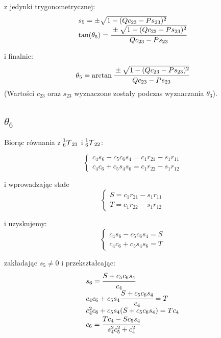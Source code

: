 \documentclass[]{article}
\newcommand\T{\mathcal{T}}
\begin{document}
z jedynki trygonometrycznej:
\begin{equation}\begin{array}{l}
s_5 = \pm \sqrt{1 - (Qc_{23} - Ps_{23})^2} \\
\tan(\theta_5) = \cfrac{\pm \sqrt{1 - (Qc_{23} - Ps_{23})^2}}{Qc_{23} - Ps_{23}}
\end{array}\end{equation}

i finalnie:
\begin{equation}
\theta_5 = \arctan\cfrac{\pm \sqrt{1 - (Qc_{23} - Ps_{23})^2}}{Qc_{23} - Ps_{23}}
\end{equation}
(Wartości $c_{23}$ oraz $s_{23}$ wyznaczone zostały podczas wyznaczania $\theta_3$).

\subsection{$\theta_6$}
Biorąc równania z $\prescript{1}{6}{\T}_{21}$ i $\prescript{1}{6}{\T}_{22}$:

\begin{equation}\left\{\begin{array}{l}
c_4s_6 - c_5c_6s_4 = c_1r_{21} - s_1r_{11} \\
c_4c_6 + c_5s_4s_6 = c_1r_{22} - s_1r_{12}
\end{array}\right.\end{equation}

i wprowadzając stałe
\begin{equation}\left\{\begin{array}{l}
S = c_1r_{21} - s_1r_{11} \\
T = c_1r_{22} - s_1r_{12}
\end{array}\right.\end{equation}

i uzyskujemy:
\begin{equation}\left\{\begin{array}{l}
c_4s_6 - c_5c_6s_4 = S \\
c_4c_6 + c_5s_4s_6 = T
\end{array}\right.\end{equation}

zakładając $s_5 \neq 0$ i przekształcając:
\begin{equation}\begin{array}{l}
s_6 = \cfrac{S + c_5c_6s_4}{c_4} \\
c_4c_6 + c_5s_4\cfrac{S + c_5c_6s_4}{c_4} = T \\
c_4^2c_6 + c_5s_4(S + c_5c_6s_4) = Tc_4 \\
c_6 = \cfrac{Tc_4 - Sc_5s_4}{s_4^2c_5^2 + c_4^2}
\end{array}\end{equation}
\end{document}
